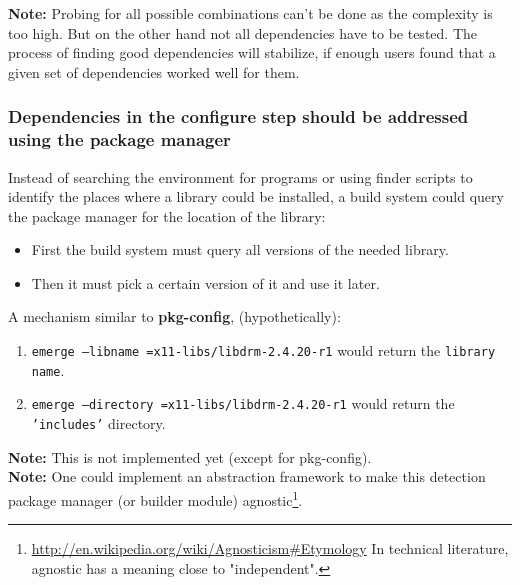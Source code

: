 \documentclass[a4paper,10pt]{article}
\begin{document}
\textbf{Note:} Probing for all possible combinations can't be done as the complexity is too high. But on the other hand not all dependencies have to be tested. The process of finding good dependencies will stabilize, if enough users found that a given set of dependencies worked well for them.






\subsubsection{Dependencies in the configure step should be addressed using the package manager}
\label{dependenciebypackagemanager}
Instead of searching the environment for programs or using finder scripts to identify the places where a library could be installed, a build system could query the package manager for the location of the library:

\begin{itemize}
\item First the build system must query all versions of the needed library.
\item Then it must pick a certain version of it and use it later.
\end{itemize}

A mechanism similar to \textbf{pkg-config}, (hypothetically): 
\begin{enumerate}
\item \texttt{emerge --libname =x11-libs/libdrm-2.4.20-r1} would return the \texttt{library name}.
\item \texttt{emerge --directory =x11-libs/libdrm-2.4.20-r1} would return the \texttt{'includes'} directory.
\end{enumerate}

\textbf{Note:} This is not implemented yet (except for pkg-config).\\

\textbf{Note:} One could implement an abstraction framework to make this detection package manager (or builder module) agnostic\footnote{\url{http://en.wikipedia.org/wiki/Agnosticism\#Etymology} In technical literature, agnostic has a meaning close to "independent".}.
\end{document}
